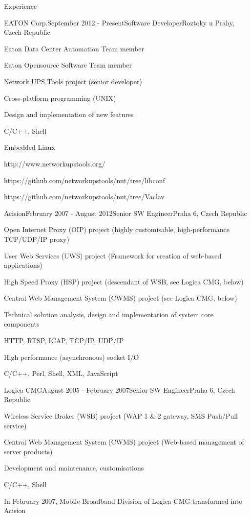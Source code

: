 \documentclass{resume} %
\begin{document}
\begin{rSection}{Experience}

\begin{rSubsection}{EATON Corp.}{September 2012 - Present}{Software Developer}{Roztoky u Prahy, Czech Republic}
\item Eaton Data Center Automation Team member
\item Eaton Opensource Software Team member
\item Network UPS Tools project (senior developer)
\item Cross-platform programming (UNIX)
\item Design and implementation of new features
\item C/C++, Shell
\item Embedded Linux
\item http://www.networkupstools.org/
\item https://github.com/networkupstools/nut/tree/libconf
\item https://github.com/networkupstools/nut/tree/Vaclav
\end{rSubsection}


\begin{rSubsection}{Acision}{February 2007 - August 2012}{Senior SW Engineer}{Praha 6, Czech Republic}
\item Open Internet Proxy (OIP) project (highly customisable, high-performance TCP/UDP/IP proxy)
\item User Web Services (UWS) project (Framework for creation of web-based applications)
\item High Speed Proxy (HSP) project (descendant of WSB, see Logica CMG, below)
\item Central Web Management System (CWMS) project (see Logica CMG, below)
\item Technical solution analysis, design and implementation of system core components
\item HTTP, RTSP, ICAP, TCP/IP, UDP/IP
\item High performance (asynchronous) socket I/O
\item C/C++, Perl, Shell, XML, JavaScript
\end{rSubsection}


\begin{rSubsection}{Logica CMG}{August 2005 - February 2007}{Senior SW Engineer}{Praha 6, Czech Republic}
\item Wireless Service Broker (WSB) project (WAP 1 \& 2 gateway, SMS Push/Pull service)
\item Central Web Management System (CWMS) project (Web-based management of server products)
\item Development and maintenance, customisations
\item C/C++, Shell
\item In February 2007, Mobile Broadband Division of Logica CMG transformed into Acision
\end{rSubsection}


\end{rSection}
\end{document}
